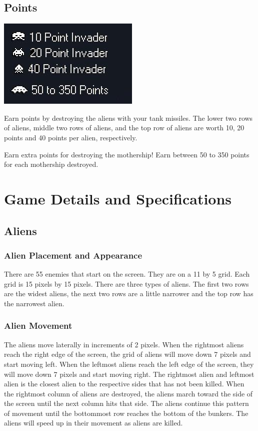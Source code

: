 \documentclass[11pt,letter,oneside]{report}
\begin{document}
\subsection{Points}
\includegraphics[]{scoring.jpg}

Earn points by destroying the aliens with your tank missiles. The lower two rows of aliens, middle two rows of aliens, and the top row of aliens are worth 10, 20 points and 40 points per alien, respectively.

Earn extra points for destroying the mothership! Earn between 50 to 350 points for each mothership destroyed.

\section{Game Details and Specifications}

\subsection{Aliens}

\subsubsection{Alien Placement and Appearance}
There are 55 enemies that start on the screen.  They are on a 11 by 5 grid.  Each grid is 15 pixels by 15 pixels.  There are three types of aliens.  The first two rows are the widest aliens, the next two rows are a little narrower and the top row has the narrowest alien.

\subsubsection{Alien Movement}
The aliens move laterally in increments of 2 pixels.  When the rightmost aliens reach the right edge of the screen, the grid of aliens will move down 7 pixels and start moving left.  When the leftmost aliens reach the left edge of the screen, they will move down 7 pixels and start moving right.  The rightmost alien and leftmost alien is the closest alien to the respective sides that has not been killed. When the rightmost column of aliens are destroyed, the aliens march toward the side of the screen until the next column hits that side. The aliens continue this pattern of movement until the bottommost row reaches the bottom of the bunkers. The aliens will speed up in their movement as aliens are killed.
\end{document}
